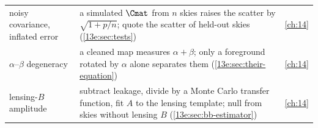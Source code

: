 \begin{xltabular}{\linewidth}{@{}>{\raggedright\arraybackslash}p{2.6cm}
  >{\raggedright\arraybackslash}X >{\raggedright\arraybackslash}p{2.5cm}@{}}
noisy covariance, inflated error & a simulated $\Cmat$ from $n$ skies raises the scatter by $\sqrt{1+p/n}$; quote the scatter of held-out skies (\cref{13e:sec:tests}) & \cref{ch:14}\\
$\alpha$--$\beta$ degeneracy & a cleaned map measures $\alpha+\beta$; only a foreground rotated by $\alpha$ alone separates them (\cref{13e:sec:their-equation}) & \cref{ch:14}\\
lensing-$B$ amplitude & subtract leakage, divide by a Monte Carlo transfer function, fit $A$ to the lensing template; null from skies without lensing $B$ (\cref{13e:sec:bb-estimator}) & \cref{ch:14}\\
\bottomrule
\end{xltabular}
\endgroup
  